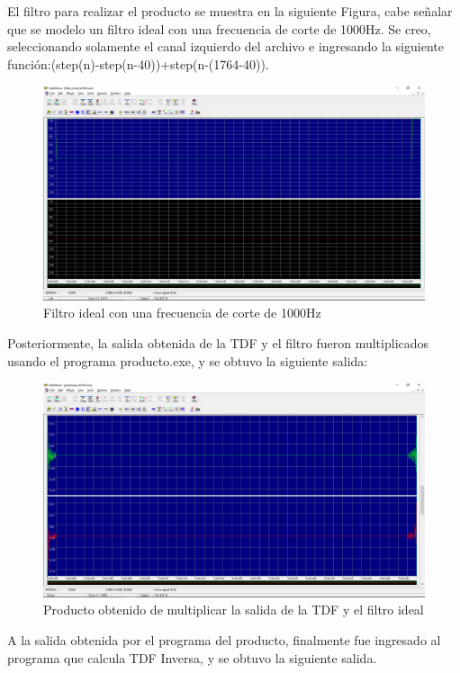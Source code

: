 El filtro para realizar el producto se muestra en la siguiente Figura, cabe señalar que se modelo un filtro ideal con una frecuencia de corte de 1000Hz. Se creo, seleccionando solamente el canal izquierdo del archivo e ingresando la siguiente función:(step(n)-step(n-40))+step(n-(1764-40)).
\begin{figure}[H]
	\centering
	\includegraphics[scale=.3]{img/filtro.png}
	\caption{Filtro ideal con una frecuencia de corte de 1000Hz}
	\label{fig:prueba3}		
\end{figure}
Posteriormente, la salida obtenida de la TDF y el filtro fueron multiplicados usando el programa producto.exe, y se obtuvo la siguiente salida:
\begin{figure}[H]
	\centering
	\includegraphics[scale=.35]{img/producto.png}
	\caption{Producto obtenido de multiplicar la salida de la TDF y el filtro ideal}
	\label{fig:prueba4}		
\end{figure}
A la salida obtenida por el programa del producto, finalmente fue ingresado al programa que calcula TDF Inversa, y se obtuvo la siguiente salida.
